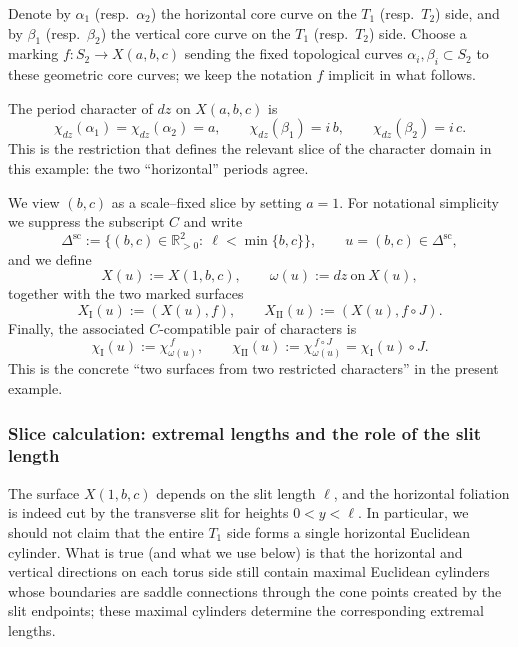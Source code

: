 \documentclass[a4paper,12pt]{amsart}
\newcommand{\R}{\mathbb{R}}
\theoremstyle{plain}
\theoremstyle{definition}
\begin{document}
Denote by \(\alpha_1\) (resp.\ \(\alpha_2\)) the horizontal core curve on the \(T_1\) (resp.\ \(T_2\)) side,
and by \(\beta_1\) (resp.\ \(\beta_2\)) the vertical core curve on the \(T_1\) (resp.\ \(T_2\)) side.
Choose a marking \(f:S_2\to X(a,b,c)\) sending the fixed topological curves
\(\alpha_i,\beta_i\subset S_2\) to these geometric core curves; we keep the notation \(f\) implicit in what follows.

The period character of \(dz\) on \(X(a,b,c)\) is
\[
\chi_{dz}(\alpha_1)=\chi_{dz}(\alpha_2)=a,
\qquad
\chi_{dz}(\beta_1)=i\,b,
\qquad
\chi_{dz}(\beta_2)=i\,c.
\]
This is the restriction that defines the relevant slice of the character domain in this example: the two
``horizontal'' periods agree.

We view \((b,c)\) as a scale--fixed slice by setting \(a=1\).  For notational simplicity we suppress the
subscript \(C\) and write
\[
\Delta^{\mathrm{sc}}_{}
:=\{(b,c)\in\R_{>0}^2:\ \ell<\min\{b,c\}\},
\qquad
u=(b,c)\in \Delta^{\mathrm{sc}}_{},
\]
and we define
\[
X(u):=X(1,b,c),\qquad \omega(u):=dz\ \text{on}\ X(u),
\]
together with the two marked surfaces
\[
X_{\mathrm{I}}(u):=(X(u),f),
\qquad
X_{\mathrm{II}}(u):=(X(u),f\circ J).
\]
Finally, the associated \(C\)-compatible pair of characters is
\[
\chi_{\mathrm{I}}(u):=\chi_{\omega(u)}^{\,f},
\qquad
\chi_{\mathrm{II}}(u):=\chi_{\omega(u)}^{\,f\circ J}
=\chi_{\mathrm{I}}(u)\circ J.
\]
This is the concrete ``two surfaces from two restricted characters''  in the present example.



\subsubsection{Slice calculation: extremal lengths and the role of the slit length}

The surface \(X(1,b,c)\) depends on the slit length \(\ell\), and the horizontal foliation is indeed
cut by the transverse slit for heights \(0<y<\ell\).  In particular, we should not claim that the
entire \(T_1\) side forms a single horizontal Euclidean cylinder.
What is true (and what we use below) is that the horizontal and vertical directions on each torus side
still contain maximal Euclidean cylinders whose boundaries are saddle connections through the cone
points created by the slit endpoints; these maximal cylinders determine the corresponding extremal lengths.
\end{document}
